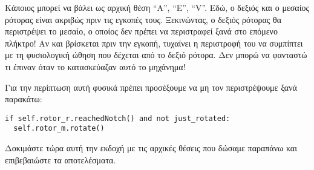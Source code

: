 \documentclass[a4paper,twoside,12pt]{article}
\begin{document}
Κάποιος μπορεί να βάλει ως αρχική θέση “A”, “E”, “V”. Εδώ, ο δεξιός και ο μεσαίος ρότορας είναι ακριβώς πριν τις εγκοπές τους. Ξεκινώντας, ο δεξιός ρότορας θα περιστρέψει το μεσαίο, ο οποίος δεν πρέπει να περιστραφεί ξανά στο επόμενο πλήκτρο! Αν και βρίσκεται πριν την εγκοπή, τυχαίνει η περιστροφή του να συμπίπτει με τη φυσιολογική ώθηση που δέχεται από το δεξιό ρότορα. Δεν μπορώ να φανταστώ τι έπιναν όταν το κατασκεύαζαν αυτό το μηχάνημα!

Για την περίπτωση αυτή φυσικά πρέπει προσέξουμε να μη τον περιστρέψουμε ξανά παρακάτω:

\begin{verbatim}
if self.rotor_r.reachedNotch() and not just_rotated:
  self.rotor_m.rotate()
\end{verbatim}

Δοκιμάστε τώρα αυτή την εκδοχή με τις αρχικές θέσεις που δώσαμε παραπάνω και επιβεβαιώστε τα αποτελέσματα. 
\end{document}
